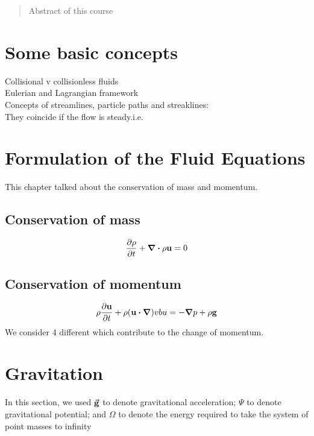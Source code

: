 \documentclass[12pt,a4paper]{article}
\begin{document}
\begin{titlepage}
    \maketitle
\end{titlepage}

\tableofcontents

\newpage

\begin{abstract}
\noindent
Abstract of this course
\end{abstract}
\section{Some basic concepts}
Collisional v collisionless fluids\\
Eulerian and Lagrangian framework\\
Concepts of streamlines, particle paths and streaklines:\\
They coincide if the flow is steady.i.e. \\
\section{Formulation of the Fluid Equations}
This chapter talked about the conservation of mass and momentum.
\subsection{Conservation of mass}
\begin{equation}
    \pdv{\rho}{t} + \div{\rho \vb{u}} = 0
\end{equation}
\subsection{Conservation of momentum}
\begin{equation}
    \rho \pdv{\vb{u}}{t} + \rho (\vb{u}\dotproduct \grad)vb{u} = -\grad{p}+ \rho \vb{g}
\end{equation}
We consider 4 different which contribute to the change of momentum.
\section{Gravitation}
In this section, 
we used $\va{g}$ to denote gravitational acceleration; 
$\Psi$ to denote gravitational potential;
and $\Omega$ to denote the energy required to take the system of point masses to infinity\\
\\
\end{document}
